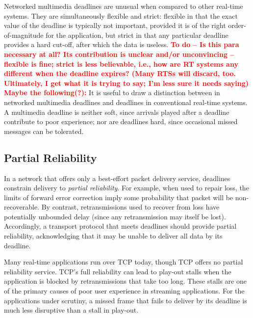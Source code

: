 \documentclass[10pt]{sig-alternate-05-2015}
\newcommand{\ie}{{i.e.,}\xspace}
\newcommand{\todo}[1]{\textbf{\textcolor{red}{To do -- #1}}}
\begin{document}
Networked multimedia deadlines are unusual when compared to other real-time
systems. They are simultaneously flexible and strict: flexible in that the exact
value of the deadline is typically not important, provided it is of the right
order-of-magnitude for the application, but strict in that any particular
deadline provides a hard cut-off, after which the data is useless. \todo{Is this para necessary at all? Its contribution is unclear and/or unconvincing -- flexible is fine; strict is less believable, \ie
how are RT systems any different when the deadline expires? (Many RTSs will
discard, too. Ultimately, I get what it is trying to say; I'm less sure it needs saying) Maybe the following(?):}
It is useful to draw a distinction between in networked multimedia deadlines and
deadlines in conventional real-time systems. A multimedia deadline is neither soft, since arrivals played after a deadline contribute to poor experience; nor are deadlines hard, since occasional missed messages can be tolerated.

\subsection{Partial Reliability}
In a network that offers only a best-effort packet delivery service, deadlines
constrain delivery to \emph{partial reliability}.
For example, when used to repair loss, the limits of forward error correction
imply some probability that packet will be non-recoverable. By contrast,
retransmissions used to recover from loss have potentially unbounded delay
(since any retransmission may itself be lost).
Accordingly, a transport protocol that meets deadlines should provide partial
reliability, acknowledging that it may be unable to deliver all data by its
deadline.

Many real-time applications run over TCP today, though TCP offers no partial
reliability service. TCP's full reliability can lead to play-out stalls
when the application is blocked by retransmissions that take too
long. These stalls are one of the primary causes of poor user experience in
streaming applications.
For the applications under scrutiny, a missed frame that fails to deliver by its
deadline is much less disruptive than a stall in play-out.
\end{document}
